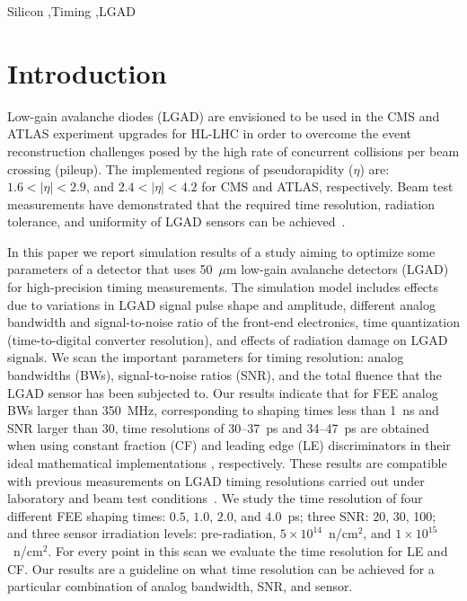 \documentclass[preprint,1p]{elsarticle}
\begin{document}
\begin{frontmatter}
\begin{keyword}

Silicon \sep Timing \sep LGAD

\end{keyword}

\end{frontmatter}

\tableofcontents


\section{Introduction}

Low-gain avalanche diodes (LGAD) are envisioned to be used in the CMS and ATLAS experiment upgrades for HL-LHC in order to overcome
the event reconstruction challenges posed by the high rate of concurrent
collisions per beam crossing (pileup). The implemented regions of pseudorapidity ($\eta$)
are: $1.6< |\eta| <2.9$, and $2.4< |\eta|<4.2$ for CMS and ATLAS, respectively.
 Beam test measurements have demonstrated that the required time resolution,
radiation tolerance, and uniformity of LGAD sensors can be achieved~\cite{Apresyan:2018oln}.

In this paper we report simulation results of a study aiming to optimize some
parameters of a detector that uses 50~$\mu$m low-gain avalanche detectors (LGAD) for
high-precision timing measurements. The simulation model includes effects due to variations in LGAD signal pulse shape and amplitude,
different analog bandwidth and signal-to-noise ratio of the front-end electronics, time
quantization (time-to-digital converter resolution), and effects of radiation damage on LGAD signals.
We scan the important parameters for timing resolution: analog bandwidths (BWs),
signal-to-noise ratios (SNR), and the total fluence that the LGAD sensor has been subjected to.
Our results indicate that for FEE analog BWs larger than 350~\si{MHz},
corresponding to shaping times less than 1~\si{ns} and SNR larger than 30, time resolutions of 30--37~\si{ps} and 34--47~\si{ps}
are obtained when using constant fraction (CF) and leading edge (LE) discriminators in their ideal mathematical implementations , respectively.
These results are compatible with previous measurements on LGAD timing resolutions carried out under
laboratory and beam test conditions~\cite{Apresyan:2018oln, Cartiglia201783, PELLEGRINI201412}.
We study the time resolution of four different FEE shaping times: $0.5$, $1.0$,
$2.0$, and $4.0$~\si{ps}; three SNR: 20, 30, 100; and three sensor irradiation
levels: pre-radiation, $5\times 10^{14}$~n/cm$^2$, and $1\times 10^{15}$~n/cm$^2$.
For every point in this scan we evaluate the time resolution for LE and CF.
Our results are a guideline on what time resolution can
be achieved for a particular combination of analog bandwidth, SNR, and sensor.
\end{document}
